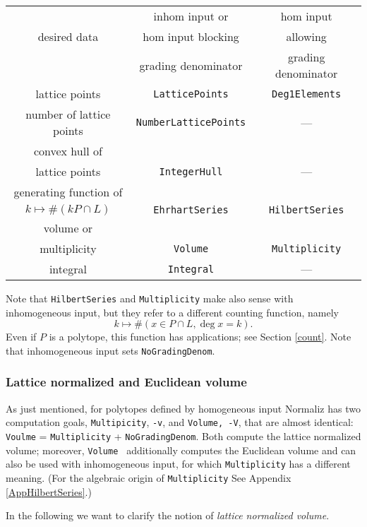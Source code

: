 \documentclass[12pt,a4paper]{scrartcl}
\theoremstyle{definition}
\begin{document}
\begin{center}
	\begin{tabular}[pos]{|c|c|c|}
		\hline
		& inhom input or&  hom input\\
		desired data & hom input blocking & allowing\\
		&grading denominator& grading denominator\\
		\hline\hline
		lattice points &\verb|LatticePoints|&\verb|Deg1Elements|\\
		\hline
		number of lattice points& \verb|NumberLatticePoints|& ---\\ 
		\hline
		convex hull of&&\\
		lattice points& \verb|IntegerHull|& ---\\ 
		\hline
		generating function of&&\\
		$k\mapsto \#(kP\cap L) $&\verb|EhrhartSeries|&\verb|HilbertSeries|\\
		\hline
		volume or&&\\
		multiplicity& \verb|Volume|&\verb|Multiplicity|\\
		\hline
		integral&\verb|Integral|&---\\
		\hline
	\end{tabular}
\end{center}

Note that \verb|HilbertSeries| and \verb|Multiplicity| make also sense with inhomogeneous input, but they refer to a different counting function, namely
$$
k\mapsto \#(x\in P\cap L, \deg x=k).
$$
Even if $P$ is a polytope, this function has applications; see Section \ref{count}. Note that inhomogeneous input sets \verb|NoGradingDenom|.

\subsubsection{Lattice normalized and Euclidean volume}\label{volume}

As just mentioned, for polytopes defined by homogeneous input Normaliz has two computation goals, \verb|Multipicity|, \verb|-v|, and \verb|Volume, -V|, that are almost identical:  \verb|Voulme| = \verb|Multiplicity| + \verb|NoGradingDenom|. Both compute the lattice normalized volume; moreover, \verb|Volume | additionally computes the Euclidean volume and can also be used with inhomogeneous input, for which \verb|Multiplicity| has a different meaning. (For the algebraic origin of \verb|Multiplicity| See Appendix \ref{AppHilbertSeries}.)

In the following we want to clarify the notion of \emph{lattice normalized volume}.
\end{document}
